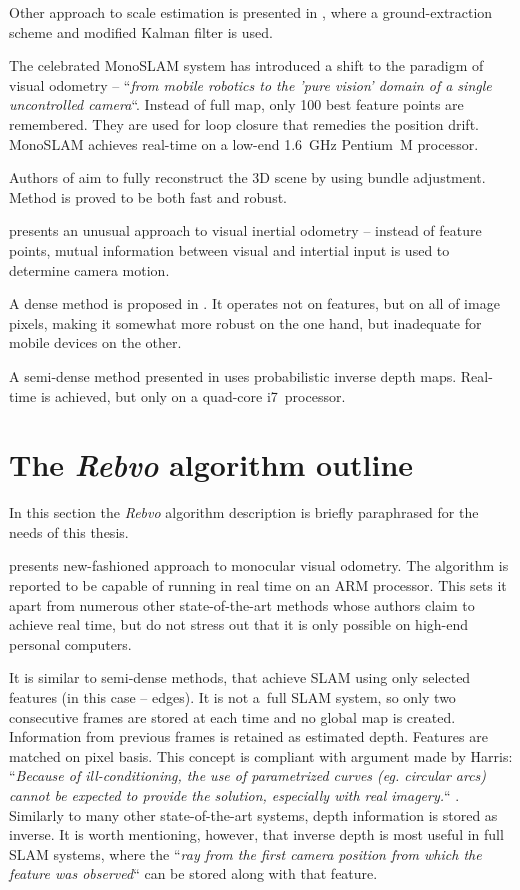 Other approach to scale estimation is presented in \cite{xiao2015novel}, where a ground-extraction scheme and modified Kalman filter is used.

The celebrated MonoSLAM \cite{monoslam} system has introduced a shift to the paradigm of visual odometry -- ``\textit{from mobile robotics to the 'pure vision' domain of a single uncontrolled camera}``. Instead of full map, only 100 best feature points are remembered. They are used for loop closure that remedies the position drift. MonoSLAM achieves real-time on a low-end 1.6~GHz Pentium~M processor.


Authors of \cite{mouragnon2006real} aim to fully reconstruct the 3D scene by using bundle adjustment. Method is proved to be both fast and robust.

\cite{gui2015robust} presents an unusual approach to visual inertial odometry -- instead of feature points, mutual information between visual and intertial input is used to determine camera motion.

A dense method is proposed in \cite{robust_visual_odometry_estimation}. It operates not on features, but on all of image pixels, making it somewhat more robust on the one hand, but inadequate for mobile devices on the other.

A semi-dense method presented in \cite{semi_dense} uses probabilistic inverse depth maps. Real-time is achieved, but only on a quad-core i7~processor.



\section{The \textit{Rebvo} algorithm outline}
\label{sec:rebvo_outline}

In this section the \textit{Rebvo} algorithm description is briefly paraphrased for the needs of this thesis.

\cite{jose2015realtime} presents new-fashioned approach to monocular visual odometry. The algorithm is reported to be capable of running in real time on an ARM processor. This sets it apart from numerous other state-of-the-art methods whose authors claim to achieve real time, but do not stress out that it is only possible on high-end personal computers.

It is similar to semi-dense methods, that achieve SLAM using only selected features (in this case -- edges). It is not a~full SLAM system, so only two consecutive frames are stored at each time and no global map is created. Information from previous frames is retained as estimated depth. Features are matched on pixel basis. This concept is compliant with argument made by Harris: ``\textit{Because of ill-conditioning, the use of parametrized curves (eg. circular arcs) cannot be expected to provide the solution, especially with real imagery.}`` \cite{harris}. Similarly to many other state-of-the-art systems, depth information is stored as inverse. It is worth mentioning, however, that inverse depth is most useful in full SLAM systems, where the ``\textit{ray from the first camera position from which the feature was observed}`` \cite{civera2008inverse} can be stored along with that feature.


